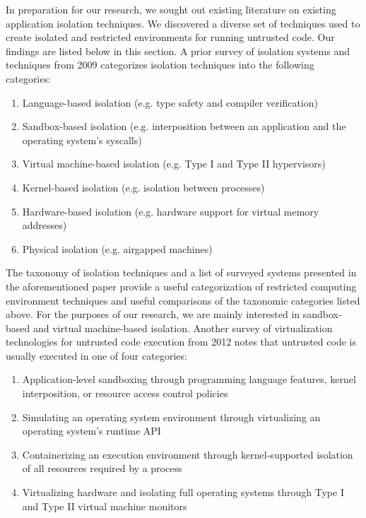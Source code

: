 \documentclass{proc}
\begin{document}
In preparation for our research, we sought out existing literature on existing application isolation techniques. We discovered a diverse set of techniques used to create isolated and restricted environments for running untrusted code. Our findings are listed below in this section.
\newline\newline
A prior survey of isolation systems and techniques from 2009 \cite{viswanathan2009isolation} categorizes isolation techniques into the following categories:
\begin{enumerate}
    \item Language-based isolation (e.g. type safety and compiler verification)
    \item Sandbox-based isolation (e.g. interposition between an application and the operating system's syscalls)
    \item Virtual machine-based isolation (e.g. Type I and Type II hypervisors)
    \item Kernel-based isolation (e.g. isolation between processes)
    \item Hardware-based isolation (e.g. hardware support for virtual memory addresses)
    \item Physical isolation (e.g. airgapped machines)
\end{enumerate}
The taxonomy of isolation techniques and a list of surveyed systems presented in the aforementioned paper provide a useful categorization of restricted computing environment techniques and useful comparisons of the taxonomic categories listed above. For the purposes of our research, we are mainly interested in sandbox-based and virtual machine-based isolation.
\newline\newline
Another survey of virtualization technologies for untrusted code execution from 2012 \cite{wen2012virtualization} notes that untrusted code is usually executed in one of four categories:
\begin{enumerate}
    \item Application-level sandboxing through programming language features, kernel interposition, or resource access control policies
    \item Simulating an operating system environment through virtualizing an operating system's runtime API
    \item Containerizing an execution environment through kernel-supported isolation of all resources required by a process
    \item Virtualizing hardware and isolating full operating systems through Type I and Type II virtual machine monitors
\end{enumerate}
\end{document}

